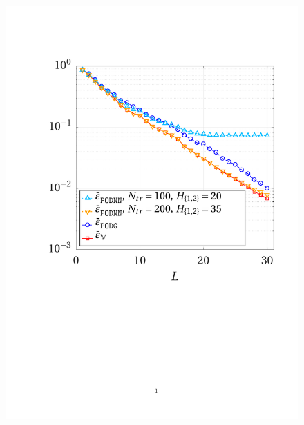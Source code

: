 \documentclass[longtitle]{elsarticle}
\numberwithin{equation}{section}
\theoremstyle{theorem}
\theoremstyle{definition}
\theoremstyle{remark}
\theoremstyle{proposition}
\numberwithin{figure}{section}
\begin{document}
		\begin{figure}[t!]
			\center
			\includegraphics[scale = 0.395, trim = {1.5cm 9.6cm 1.5cm 3.8cm}, clip]{poisson2d_3_error_vs_rank_bis}
			\hspace*{0.8cm}

\end{figure}
\end{document}

